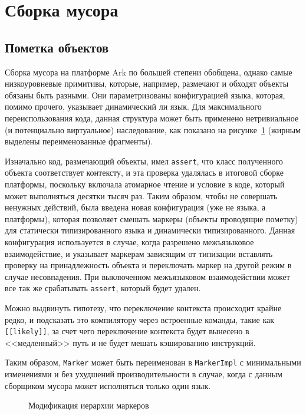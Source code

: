 \documentclass[times
]{itmo-student-thesis}
\begin{document}
\section{Сборка мусора}
\subsection{Пометка объектов}
Сборка мусора на платформе Ark по большей степени обобщена, однако самые низкоуровневые примитивы, которые, например, размечают и обходят объекты обязаны быть разными. Они параметризованы конфигурацией языка, которая, помимо прочего, указывает динамический ли язык. Для максимального переиспользования кода, данная структура может быть применено нетривиальное (и потенциально виртуальное) наследование, как показано на рисунке~\ref{fig:gc-markers} (жирным выделены переименованные фрагменты).

Изначально код, размечающий объекты, имел \texttt{assert}, что класс полученного объекта соответствует контексту, и эта проверка удалялась в итоговой сборке платформы, поскольку включала атомарное чтение и условие в коде, который может выполняться десятки тысяч раз. Таким образом, чтобы не совершать ненужных действий, была введена новая конфигурация (уже не языка, а платформы), которая позволяет смешать маркеры (объекты проводящие пометку) для статически типизированного языка и динамически типизированного. Данная конфигурация используется в случае, когда разрешено межъязыковое взаимодействие, и указывает маркерам зависящим от типизации вставлять проверку на принадлежность объекта и переключать маркер на другой режим в случае несовпадения. При выключенном межъязыковом взаимодействии может все так же срабатывать \texttt{assert}, который будет удален.

Можно выдвинуть гипотезу, что переключение контекста происходит крайне редко, и подсказать это компилятору через встроенные команды, такие как \texttt{[[likely]]}, за счет чего переключение контекста будет вынесено в <<медленный>> путь и не будет мешать кэшированию инструкций.

Таким образом, \texttt{Marker} может быть переименован в \texttt{MarkerImpl} с минимальными изменениями и без ухудшений производительности в случае, когда с данным сборщиком мусора может исполняться только один язык.
\begin{figure}[!h]
\caption{Модификация иерархии маркеров}\label{fig:gc-markers}
\centering
\end{figure}
\end{document}
